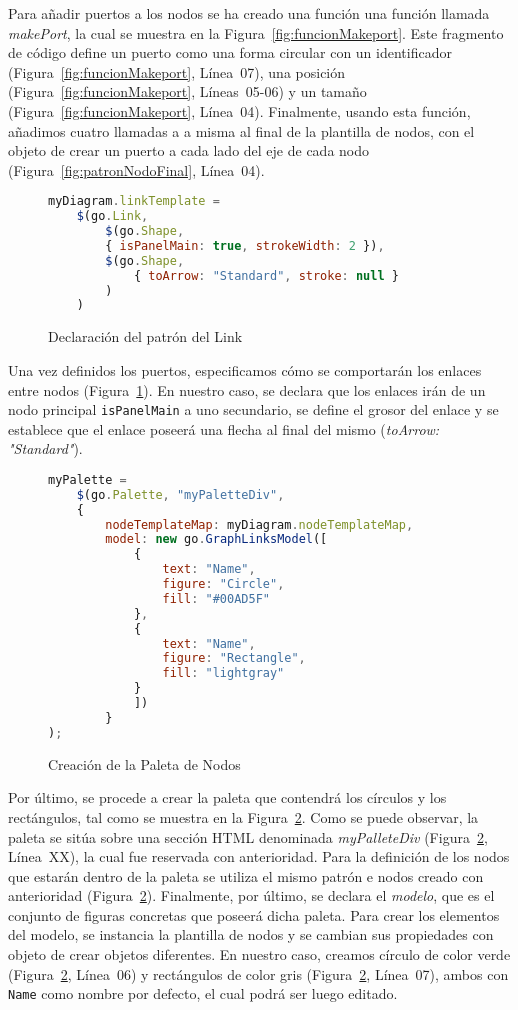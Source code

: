 Para añadir puertos a los nodos se ha creado una función una función llamada \emph{makePort}, la cual se muestra en la Figura~\ref{fig:funcionMakeport}. Este fragmento de código define un puerto como una forma circular con un identificador (Figura~\ref{fig:funcionMakeport}, Línea~07), una posición (Figura~\ref{fig:funcionMakeport}, Líneas~05-06) y un tamaño (Figura~\ref{fig:funcionMakeport}, Línea~04). Finalmente, usando esta función, añadimos cuatro llamadas a a misma al final de la plantilla de nodos, con el objeto de crear un puerto a cada lado del eje de cada nodo (Figura~\ref{fig:patronNodoFinal}, Línea~04).

\begin{figure}[H]
	\centering
	\begin{lstlisting}[language=JavaScript]
	myDiagram.linkTemplate =
	$(go.Link,
		$(go.Shape,
		{ isPanelMain: true, strokeWidth: 2 }),
		$(go.Shape,
			{ toArrow: "Standard", stroke: null }
		)
	)\end{lstlisting}
	\caption{Declaración del patrón del Link}
	\label{fig:patronlink}
\end{figure}

Una vez definidos los puertos, especificamos cómo se comportarán los enlaces entre nodos (Figura~\ref{fig:patronlink}). En nuestro caso, se declara que los enlaces irán de un nodo principal \texttt{isPanelMain} a uno secundario,  se define el grosor del enlace y se establece que el enlace poseerá una flecha al final del mismo (\emph{toArrow: "Standard"}).




\begin{figure}[H]
	\centering
\begin{lstlisting}[language=JavaScript]
myPalette =
	$(go.Palette, "myPaletteDiv",
	{
		nodeTemplateMap: myDiagram.nodeTemplateMap,
		model: new go.GraphLinksModel([
			{ 
				text: "Name", 
				figure: "Circle", 
				fill: "#00AD5F" 
			},
			{ 
				text: "Name", 
				figure: "Rectangle", 
				fill: "lightgray" 
			}
			])
		}
);\end{lstlisting}
\caption{Creación de la Paleta de Nodos}
\label{fig:paletaNodos}
\end{figure}

Por último, se procede a crear la paleta que contendrá los círculos y los rectángulos, tal como se muestra en la Figura~\ref{fig:paletaNodos}. Como se puede observar, la paleta se sitúa sobre una sección HTML denominada \emph{myPalleteDiv} (Figura~\ref{fig:paletaNodos}, Línea~XX), la cual fue reservada con anterioridad. Para la definición de los nodos que estarán dentro de la paleta se utiliza el mismo patrón e nodos creado con anterioridad (Figura~\ref{fig:paletaNodos}). Finalmente, por último, se declara el \emph{modelo}, que es el conjunto de figuras concretas que poseerá dicha paleta. Para crear los elementos del modelo, se instancia la plantilla de nodos y se cambian sus propiedades con objeto de crear objetos diferentes. En nuestro caso, creamos círculo de color verde (Figura~\ref{fig:paletaNodos}, Línea~06) y rectángulos de color gris (Figura~\ref{fig:paletaNodos}, Línea~07), ambos con \texttt{Name} como nombre por defecto, el cual podrá ser luego editado.

